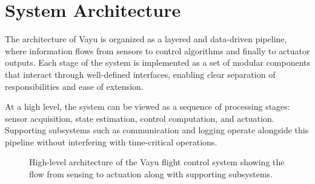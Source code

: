 \section{System Architecture}
\label{sec:vayu_architecture}

The architecture of Vayu is organized as a layered and data-driven pipeline, where information flows from sensors to control algorithms and finally to actuator outputs. Each stage of the system is implemented as a set of modular components that interact through well-defined interfaces, enabling clear separation of responsibilities and ease of extension.

At a high level, the system can be viewed as a sequence of processing stages: sensor acquisition, state estimation, control computation, and actuation. Supporting subsystems such as communication and logging operate alongside this pipeline without interfering with time-critical operations.

\begin{figure}[H]
    \centering
    \caption{High-level architecture of the Vayu flight control system showing the flow from sensing to actuation along with supporting subsystems.}
    \label{fig:vayu_architecture}
\end{figure}

